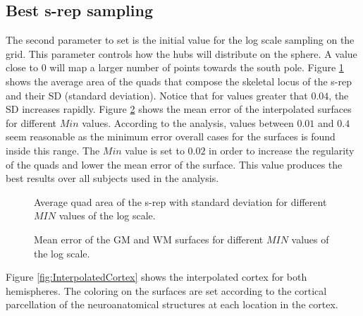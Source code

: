 \subsection{Best s-rep sampling}
\label{sec:minvalue}

The second parameter to set is the initial value for the log scale sampling on the grid.
This parameter controls how the hubs will distribute on the sphere. A value close to $0$ will 
map a larger number of points towards the south pole. 
Figure \ref{fig:AverageCell} shows the average area of the quads that compose the skeletal locus of the s-rep and their SD (standard deviation).
Notice that for values greater that $0.04$, the SD increases rapidly.
Figure \ref{fig:InitialLogValue} shows the mean error of the interpolated surfaces for different $Min$ values.
According to the analysis, values between $0.01$ and $0.4$ seem reasonable as 
the minimum error overall cases for the surfaces is found inside this range.
The $Min$ value is set to $0.02$
in order to increase the regularity of the quads and 
lower the mean error of the surface.
This value produces the best results over all subjects used in the analysis. 

\begin{figure} 
 \centering  
 \caption[Average area of an srep's quad.]{Average quad area of the s-rep with standard deviation for different $MIN$ values of the log scale.}
 \label{fig:AverageCell}  
\end{figure}

\begin{figure} 
 \centering 
 \caption[GM and WM surface mean error: log scale.]{Mean error of the GM and WM surfaces for different $MIN$ values of the log scale.}
 \label{fig:InitialLogValue} 
\end{figure}


Figure \ref{fig:InterpolatedCortex} shows the interpolated cortex for both hemispheres. 
The coloring on the surfaces are set according to the cortical
parcellation of the neuroanatomical structures at each location in the cortex. 

